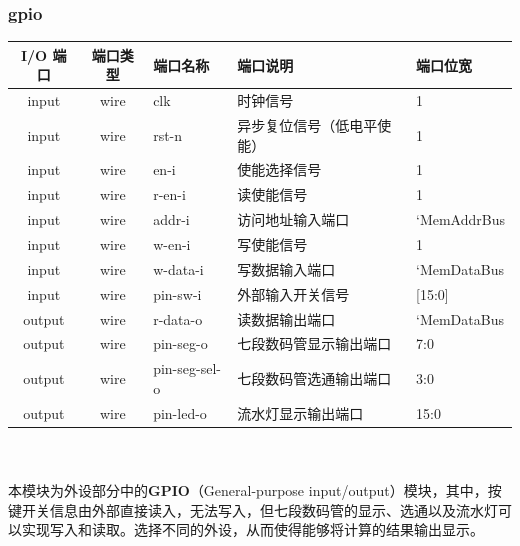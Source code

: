 \documentclass[lang=cn,11pt,a4paper]{elegantpaper}
\begin{document}
\subsubsection{gpio}
\begin{tabular}{cclll}
	\toprule
	I/O 端口 & 端口类型 &端口名称&端口说明 &端口位宽\\
	\midrule
	input &wire& clk & 时钟信号 & 1 \\
	input &wire& rst-n & 异步复位信号（低电平使能） & 1 \\
	input &wire& en-i & 使能选择信号       & 1   \\
	
	input &wire& r-en-i & 读使能信号 & 1 \\
	input &wire& addr-i & 访问地址输入端口 & `MemAddrBus  \\
	input &wire& w-en-i & 写使能信号 & 1 \\
	input &wire& w-data-i & 写数据输入端口 & `MemDataBus  \\
	input &wire& pin-sw-i & 外部输入开关信号 & [15:0]  \\
	
	output &wire& r-data-o &   读数据输出端口  & `MemDataBus  \\
	output &wire& pin-seg-o &   七段数码管显示输出端口  & 7:0 \\
	output &wire& pin-seg-sel-o &   七段数码管选通输出端口  & 3:0  \\
	output &wire& pin-led-o &  流水灯显示输出端口  & 15:0  \\
	\bottomrule
\end{tabular}\\
\\
本模块为外设部分中的\textbf{GPIO}（General-purpose input/output）模块，其中，按键开关信息由外部直接读入，无法写入，但七段数码管的显示、选通以及流水灯可以实现写入和读取。选择不同的外设，从而使得能够将计算的结果输出显示。
\end{document}
